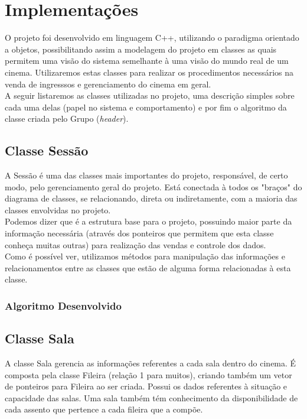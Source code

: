 \documentclass[a4paper]{article}
\begin{document}
\pagebreak

\section{Implementações}
\hspace{5 mm}O projeto foi desenvolvido em linguagem C++, utilizando o paradigma orientado a objetos, possibilitando assim a modelagem do projeto em classes as quais permitem uma visão do sistema semelhante à uma visão do mundo real de um cinema. Utilizaremos estas classes para realizar os procedimentos necessários na venda de ingresssos e gerenciamento do cinema em geral.\\
\quad{\null}\hspace{5 mm}A seguir listaremos as classes utilizadas no projeto, uma descrição simples sobre cada uma delas (papel no sistema e comportamento) e por fim o algoritmo da classe criada pelo Grupo (\textit{header}).

\subsection{Classe Sessão}
\hspace{5 mm}A Sessão é uma das classes mais importantes do projeto, responsável, de certo modo, pelo gerenciamento geral do projeto. Está conectada à todos os "braços" do diagrama de classes, se relacionando, direta ou indiretamente, com a maioria das classes envolvidas no projeto.\\
\quad{\null}\hspace{5 mm}Podemos dizer que é a estrutura base para o projeto, possuindo maior parte da informação necessária (através dos ponteiros que permitem que esta classe conheça muitas outras) para realização das vendas e controle dos dados.\\
\quad{\null}\hspace{5 mm}Como é possível ver, utilizamos métodos para manipulação das informações e relacionamentos entre as classes que estão de alguma forma relacionadas à esta classe.

\subsubsection{Algoritmo Desenvolvido}


\pagebreak

\subsection{Classe Sala}
\hspace{5 mm}A classe Sala gerencia as informações referentes a cada sala dentro do cinema. É composta pela classe Fileira (relação 1 para muitos), criando também um vetor de ponteiros para Fileira ao ser criada. Possui os dados referentes à situação e capacidade das salas. Uma sala também tém conhecimento da disponibilidade de cada assento que pertence a cada fileira que a compõe.\\
\end{document}
